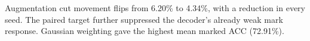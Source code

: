 Augmentation cut movement flips from 6.20\% to 4.34\%, with a reduction in every seed. The paired target further suppressed the decoder's already weak mark response. Gaussian weighting gave the highest mean marked ACC (72.91\%).
